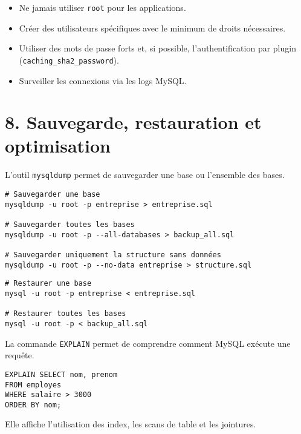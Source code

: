 \documentclass[a4paper,11pt]{article}
\begin{document}
\begin{tcolorbox}[colback=red!5!white,colframe=red!75!black,title=Bonnes pratiques sécurité]
\begin{itemize}
  \item Ne jamais utiliser \texttt{root} pour les applications.
  \item Créer des utilisateurs spécifiques avec le minimum de droits nécessaires.
  \item Utiliser des mots de passe forts et, si possible, l’authentification par plugin (\texttt{caching\_sha2\_password}).
  \item Surveiller les connexions via les logs MySQL.
\end{itemize}
\end{tcolorbox}


\section*{8. Sauvegarde, restauration et optimisation}

\begin{tcolorbox}[colback=blue!5!white,colframe=blue!75!black,title=Sauvegarde avec mysqldump]
L’outil \texttt{mysqldump} permet de sauvegarder une base ou l’ensemble des bases.
\begin{verbatim}
# Sauvegarder une base
mysqldump -u root -p entreprise > entreprise.sql

# Sauvegarder toutes les bases
mysqldump -u root -p --all-databases > backup_all.sql

# Sauvegarder uniquement la structure sans données
mysqldump -u root -p --no-data entreprise > structure.sql
\end{verbatim}
\end{tcolorbox}

\begin{tcolorbox}[colback=green!5!white,colframe=green!75!black,title=Restauration]
\begin{verbatim}
# Restaurer une base
mysql -u root -p entreprise < entreprise.sql

# Restaurer toutes les bases
mysql -u root -p < backup_all.sql
\end{verbatim}
\end{tcolorbox}

\begin{tcolorbox}[colback=yellow!5!white,colframe=yellow!75!black,title=Optimisation des requêtes avec EXPLAIN]
La commande \texttt{EXPLAIN} permet de comprendre comment MySQL exécute une requête.
\begin{verbatim}
EXPLAIN SELECT nom, prenom
FROM employes
WHERE salaire > 3000
ORDER BY nom;
\end{verbatim}
Elle affiche l’utilisation des index, les scans de table et les jointures.
\end{tcolorbox}
\end{document}
